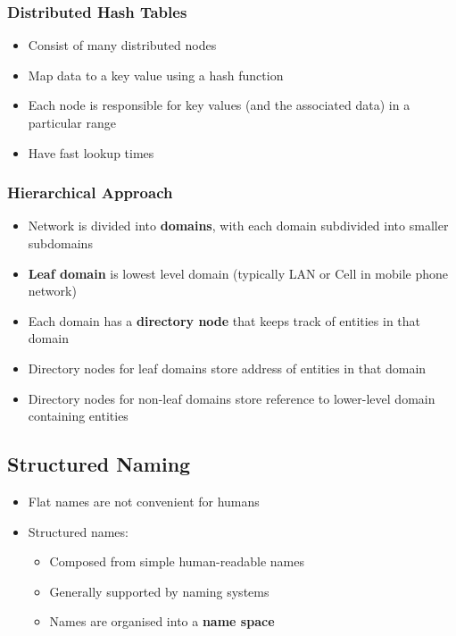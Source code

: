 \subsubsection{Distributed Hash Tables}
\begin{itemize}
	\item Consist of many distributed nodes
	\item Map data to a key value using a hash function
	\item Each node is responsible for key values (and the associated data) in a particular range
	\item Have fast lookup times	
\end{itemize}

\subsubsection{Hierarchical Approach}
\begin{itemize}
	\item Network is divided into \textbf{domains}, with each domain subdivided into smaller subdomains
	\item \textbf{Leaf domain} is lowest level domain (typically LAN or Cell in mobile phone network)
	\item Each domain has a \textbf{directory node} that keeps track of entities in that domain
	\item Directory nodes for leaf domains store address of entities in that domain
	\item Directory nodes for non-leaf domains store reference to lower-level domain containing entities	
\end{itemize}

\subsection{Structured Naming}
\begin{itemize}
	\item Flat names are not convenient for humans
	\item Structured names:
	\begin{itemize}
		\item Composed from simple human-readable names
		\item Generally supported by naming systems
		\item Names are organised into a \textbf{name space}
	\end{itemize}	
\end{itemize}

